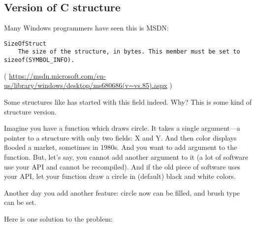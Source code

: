 \subsection{Version of C structure}

Many Windows programmers have seen this is MSDN:

\begin{lstlisting}
SizeOfStruct
    The size of the structure, in bytes. This member must be set to sizeof(SYMBOL_INFO).
\end{lstlisting}

( \url{https://msdn.microsoft.com/en-us/library/windows/desktop/ms680686(v=vs.85).aspx} )

Some structures like  has started with this field indeed. Why?
This is some kind of structure version.

Imagine you have a function which draws circle.
It takes a single argument---a pointer to a structure with only two fields: X and Y.
And then color displays flooded a market, sometimes in 1980s. And you want to add  argument to the function.
But, let's say, you cannot add another argument to it (a lot of software use your \ac{API} and cannot be recompiled).
And if the old piece of software uses your \ac{API}, let your function draw a circle in (default) black and white colors.

Another day you add another feature: circle now can be filled, and brush type can be set.

Here is one solution to the problem:


